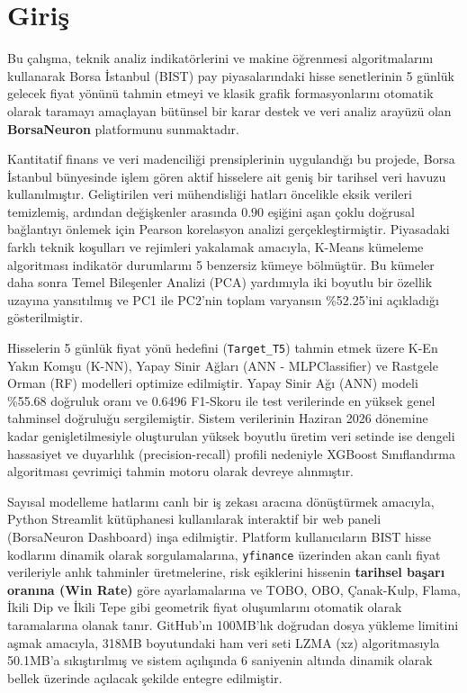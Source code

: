 \documentclass[12pt,a4paper]{report}
\begin{document}
\chapter{Giriş}

Bu çalışma, teknik analiz indikatörlerini ve makine öğrenmesi algoritmalarını kullanarak Borsa İstanbul (BIST) pay piyasalarındaki hisse senetlerinin 5 günlük gelecek fiyat yönünü tahmin etmeyi ve klasik grafik formasyonlarını otomatik olarak taramayı amaçlayan bütünsel bir karar destek ve veri analiz arayüzü olan \textbf{BorsaNeuron} platformunu sunmaktadır.

Kantitatif finans ve veri madenciliği prensiplerinin uygulandığı bu projede, Borsa İstanbul bünyesinde işlem gören aktif hisselere ait geniş bir tarihsel veri havuzu kullanılmıştır. Geliştirilen veri mühendisliği hatları öncelikle eksik verileri temizlemiş, ardından değişkenler arasında $0.90$ eşiğini aşan çoklu doğrusal bağlantıyı önlemek için Pearson korelasyon analizi gerçekleştirmiştir. Piyasadaki farklı teknik koşulları ve rejimleri yakalamak amacıyla, K-Means kümeleme algoritması indikatör durumlarını 5 benzersiz kümeye bölmüştür. Bu kümeler daha sonra Temel Bileşenler Analizi (PCA) yardımıyla iki boyutlu bir özellik uzayına yansıtılmış ve PC1 ile PC2'nin toplam varyansın \%52.25'ini açıkladığı gösterilmiştir.

Hisselerin 5 günlük fiyat yönü hedefini (\texttt{Target\_T5}) tahmin etmek üzere K-En Yakın Komşu (K-NN), Yapay Sinir Ağları (ANN - MLPClassifier) ve Rastgele Orman (RF) modelleri optimize edilmiştir. Yapay Sinir Ağı (ANN) modeli \%55.68 doğruluk oranı ve 0.6496 F1-Skoru ile test verilerinde en yüksek genel tahminsel doğruluğu sergilemiştir. Sistem verilerinin Haziran 2026 dönemine kadar genişletilmesiyle oluşturulan yüksek boyutlu üretim veri setinde ise dengeli hassasiyet ve duyarlılık (precision-recall) profili nedeniyle XGBoost Sınıflandırma algoritması çevrimiçi tahmin motoru olarak devreye alınmıştır.

Sayısal modelleme hatlarını canlı bir iş zekası aracına dönüştürmek amacıyla, Python Streamlit kütüphanesi kullanılarak interaktif bir web paneli (BorsaNeuron Dashboard) inşa edilmiştir. Platform kullanıcıların BIST hisse kodlarını dinamik olarak sorgulamalarına, \texttt{yfinance} üzerinden akan canlı fiyat verileriyle anlık tahminler üretmelerine, risk eşiklerini hissenin \textbf{tarihsel başarı oranına (Win Rate)} göre ayarlamalarına ve TOBO, OBO, Çanak-Kulp, Flama, İkili Dip ve İkili Tepe gibi geometrik fiyat oluşumlarını otomatik olarak taramalarına olanak tanır. GitHub'ın 100MB'lık doğrudan dosya yükleme limitini aşmak amacıyla, 318MB boyutundaki ham veri seti LZMA (xz) algoritmasıyla 50.1MB'a sıkıştırılmış ve sistem açılışında 6 saniyenin altında dinamik olarak bellek üzerinde açılacak şekilde entegre edilmiştir.
\end{document}
